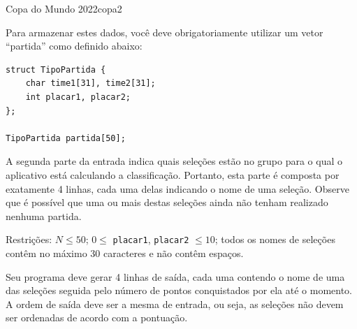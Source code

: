 \documentclass[12pt,a4paper,oneside]{article}
\begin{document}
\begin{problem}{Copa do Mundo 2022}{copa}{2}
\Notes

Para armazenar estes dados, você deve obrigatoriamente utilizar um vetor ``partida'' como definido abaixo:

\begin{lstlisting}
struct TipoPartida {
    char time1[31], time2[31];
    int placar1, placar2;
};

TipoPartida partida[50];
\end{lstlisting}

A segunda parte da entrada indica quais seleções estão no grupo para o qual o aplicativo está calculando a classificação. Portanto, esta parte é composta por exatamente 4 linhas, cada uma delas indicando o nome de uma seleção. Observe que é possível que uma ou mais destas seleções ainda não tenham realizado nenhuma partida.

Restrições: $N \leq 50$; $0 \leq$ \texttt{placar1}, \texttt{placar2} $\leq 10$; todos os nomes de seleções contêm no máximo 30 caracteres e não contêm espaços.

\OutputFile

Seu programa deve gerar 4 linhas de saída, cada uma contendo o nome de uma das seleções seguida pelo número de pontos conquistados por ela até o momento. A ordem de saída deve ser a mesma de entrada, ou seja, as seleções não devem ser ordenadas de acordo com a pontuação.


\Example

\begin{example}
%
\end{example}


\begin{example}
\end{example}
\end{problem}
\end{document}

